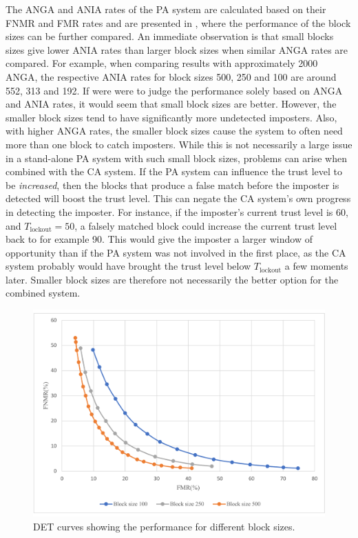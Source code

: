 The ANGA and ANIA rates of the PA system are calculated based on their FNMR and FMR rates and are presented in , where the performance of the block sizes can be further compared.
An immediate observation is that small blocks sizes give lower ANIA rates than larger block sizes when similar ANGA rates are compared.
For example, when comparing results with approximately 2000 ANGA, the respective ANIA rates for block sizes 500, 250 and 100 are around 552, 313 and 192.
If were were to judge the performance solely based on ANGA and ANIA rates, it would seem that small block sizes are better.
However, the smaller block sizes tend to have significantly more undetected imposters.
Also, with higher ANGA rates, the smaller block sizes cause the system to often need more than one block to catch imposters.
While this is not necessarily a large issue in a stand-alone PA system with such small block sizes, problems can arise when combined with the CA system.
If the PA system can influence the trust level to be \textit{increased}, then the blocks that produce a false match before the imposter is detected will boost the trust level.
This can negate the CA system's own progress in detecting the imposter.
For instance, if the imposter's current trust level is 60, and $T_{\text{lockout}}=50$, a falsely matched block could increase the current trust level back to for example 90.
This would give the imposter a larger window of opportunity than if the PA system was not involved in the first place, as the CA system probably would have brought the trust level below $T_{\text{lockout}}$ a few moments later.
Smaller block sizes are therefore not necessarily the better option for the combined system.

\begin{figure}[h]
    \centering
    \includegraphics[width=1\textwidth]{figures/block-lengths-ROC.pdf}
    \caption{DET curves showing the performance for different block sizes.}
    \label{fig:block-lengths-ROC}
\end{figure}

